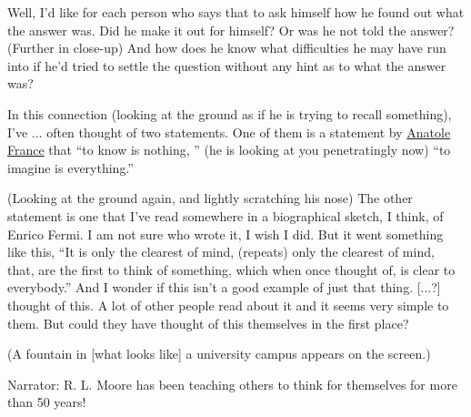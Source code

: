 \documentclass[a6paper]{article}
\begin{document}
Well, I'd like for each person who says that to ask himself how he found out what the answer was. Did he make it out for himself? Or was he not told the answer? (Further in close-up) And how does he know what difficulties he may have run into if he'd tried to settle the question without any hint as to what the answer was?

In this connection (looking at the ground as if he is trying to recall something), I've ... often thought of two statements. One of them is a statement by \href{https://en.wikipedia.org/wiki/Anatole_France}{Anatole France} that ``to know is nothing, '' (he is looking at you penetratingly now) ``to imagine is everything.''

(Looking at the ground again, and lightly scratching his nose) The other statement is one that I've read somewhere in a biographical sketch, I think, of Enrico Fermi. I am not sure who wrote it, I wish I did. But it went something like this, ``It is only the clearest of mind, (repeats) only the clearest of mind, that, are the first to think of something, which when once thought of, is clear to everybody.'' And I wonder if this isn't a good example of just that thing. [...?] thought of this. A lot of other people read about it and it seems very simple to them. But could they have thought of this themselves in the first place? 

(A fountain in [what looks like] a university campus appears on the screen.)

Narrator: R. L. Moore has been teaching others to think for themselves for more than 50 years!  
\end{document}
